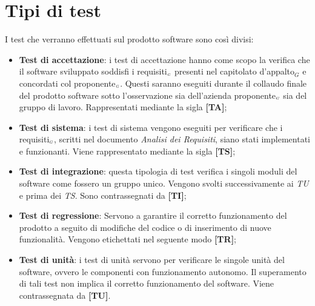 \section{Tipi di test} \label{SpecificaDeiTestTipiDiTest}
I test che verranno effettuati sul prodotto software sono così divisi:
\begin{itemize}
	\item \textbf{Test di accettazione}: i test di accettazione hanno come scopo la verifica che il software sviluppato soddisfi i requisiti$_{\scaleto{G}{3pt}}$ presenti nel capitolato d’appalto$_G$ e concordati col proponente$_{\scaleto{G}{3pt}}$.
	Questi saranno eseguiti durante il collaudo finale del prodotto software sotto l'osservazione sia dell'azienda proponente$_{\scaleto{G}{3pt}}$ sia del gruppo di lavoro.
	Rappresentati mediante la sigla \textbf{[TA]};

	\item \textbf{Test di sistema}: i test di sistema vengono eseguiti per verificare che i requisiti$_{\scaleto{G}{3pt}}$, scritti nel documento \textit{Analisi dei Requisiti}, siano stati implementati e funzionanti.
	Viene rappresentato mediante la sigla \textbf{[TS]};

	\item \textbf{Test di integrazione}: questa tipologia di test verifica i singoli moduli del software come fossero un gruppo unico.
	Vengono svolti successivamente ai \textit{TU} e prima dei \textit{TS}.
	Sono contrassegnati da \textbf{[TI]};

	\item \textbf{Test di regressione}: Servono a garantire il corretto funzionamento del prodotto a seguito di modifiche del codice o di inserimento di nuove funzionalità.
	Vengono etichettati nel seguente modo \textbf{[TR]};

	\item \textbf{Test di unità}: i test di unità servono per verificare le singole unità del software, ovvero le componenti con funzionamento autonomo.
	Il superamento di tali test non implica il corretto funzionamento del software.
	Viene contrassegnata da \textbf{[TU]}.
\end{itemize}
